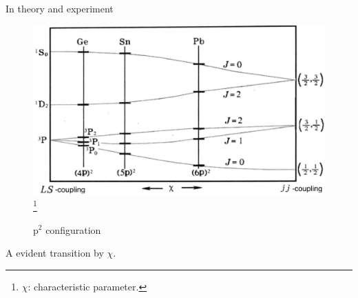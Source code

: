 \begin{frame}{In theory and experiment}
    \begin{figure}
        \centering
        \includegraphics[scale=0.4]{fig/fig 5.11.png}
        \footnote{$\chi$: characteristic parameter.}
        \caption{$\mathrm{p}^2$ configuration}
    \end{figure}
    \centering
    A evident transition by $\chi$.
\end{frame}

